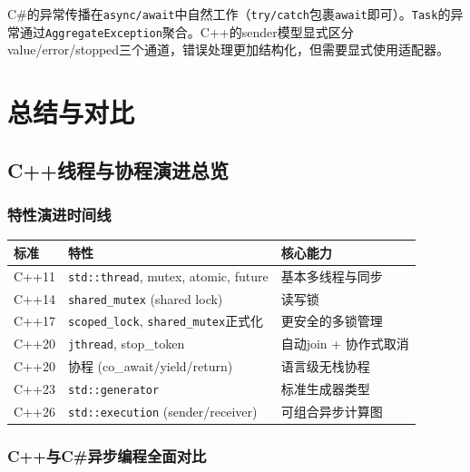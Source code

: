 \documentclass[12pt,a4paper,fontset=fandol]{ctexbook}
\newcommand{\cpp}[1]{C++#1}
\newcommand{\csharp}{C\#}
\begin{document}
\begin{compare}
\csharp{}的异常传播在\texttt{async/await}中自然工作（\texttt{try/catch}包裹\texttt{await}即可）。\texttt{Task}的异常通过\texttt{AggregateException}聚合。\cpp{}的sender模型显式区分value/error/stopped三个通道，错误处理更加结构化，但需要显式使用适配器。
\end{compare}

\part{总结与对比}

\chapter{\cpp{}线程与协程演进总览}

\section{特性演进时间线}

\begin{longtable}{llp{6cm}}
\toprule
\textbf{标准} & \textbf{特性} & \textbf{核心能力} \\
\midrule
\cpp{}11 & \texttt{std::thread}, mutex, atomic, future & 基本多线程与同步 \\
\cpp{}14 & \texttt{shared\_mutex} (shared lock) & 读写锁 \\
\cpp{}17 & \texttt{scoped\_lock}, \texttt{shared\_mutex}正式化 & 更安全的多锁管理 \\
\cpp{}20 & \texttt{jthread}, stop\_token & 自动join + 协作式取消 \\
\cpp{}20 & 协程 (co\_await/yield/return) & 语言级无栈协程 \\
\cpp{}23 & \texttt{std::generator} & 标准生成器类型 \\
\cpp{}26 & \texttt{std::execution} (sender/receiver) & 可组合异步计算图 \\
\bottomrule
\end{longtable}

\section{\cpp{}与\csharp{}异步编程全面对比}
\end{document}
